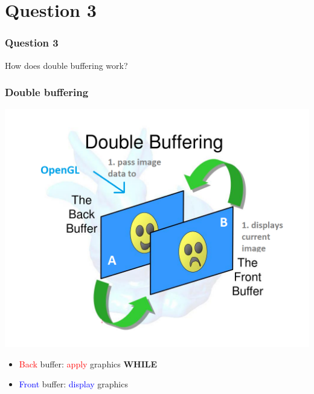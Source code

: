 \documentclass{beamer}
\begin{document}
\section{Question 3}

\begin{frame}
    \frametitle{Question 3}
    How does double buffering work?
\end{frame}

\begin{frame}
    \frametitle{Double buffering}

    \begin{center}
        \includegraphics[scale=0.4]{q3-step1.png}
    \end{center}

    \begin{itemize}
        \item \textcolor{red}{Back} buffer: \textcolor{red}{apply} graphics \textbf{WHILE}
        \item \textcolor{blue}{Front} buffer: \textcolor{blue}{display} graphics 
    \end{itemize}

\end{frame}
\end{document}
